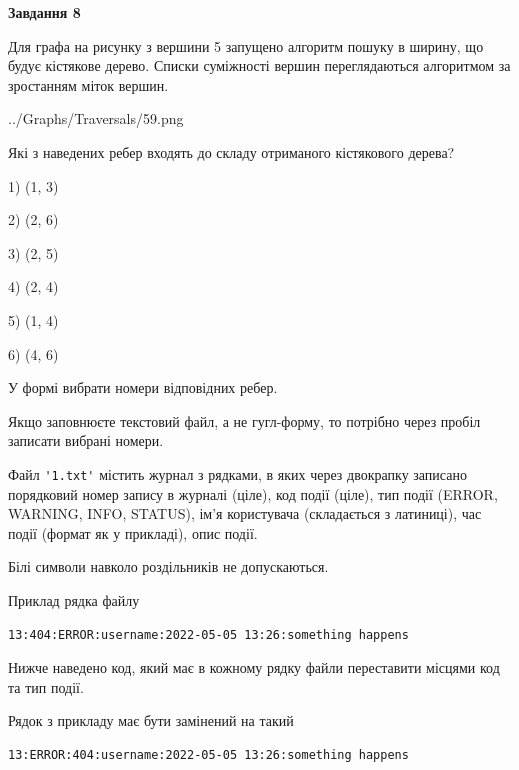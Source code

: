 \documentclass[12pt, ukrainian]{article}
\def\code#1{\Verb!#1!}
\begin{document}
{\begin {large}
{\begin {center}\textbf{Завдання 8}\end {center}}\par
Для графа на рисунку з вершини 5 запущено алгоритм пошуку в ширину, що будує кістякове дерево. Списки суміжності вершин переглядаються алгоритмом за зростанням міток вершин.\par
\begin{center}
	{../Graphs/Traversals/59.png}
\end{center}
\par Які з наведених ребер входять до складу отриманого кістякового дерева?\par
1) (1, 3)\par
2) (2, 6)\par
3) (2, 5)\par
4) (2, 4)\par
5) (1, 4)\par
6) (4, 6)\par
{\vskip 15pt} У формі вибрати номери відповідних ребер.


Якщо заповнюєте текстовий файл, а не гугл-форму, то потрібно через пробіл записа\-ти вибрані номери.\par
\newpage


Файл \code{'1.txt'} містить журнал з рядками, в яких через двокрапку записано поряд\-ко\-вий номер запису в журналі (ціле), код події (ціле), тип події (ERROR,\\ WARNING, INFO, STATUS), ім'я користувача (складається з латиниці), час події (фор\-мат як у прикладі), опис події.

Білі символи навколо роздільників не допускаються.

Приклад рядка файлу



\begin{verbatim}
13:404:ERROR:username:2022-05-05 13:26:something happens
\end{verbatim}


Нижче наведено код, який має в кожному рядку файли переставити місцями код та тип події.

Рядок з прикладу має бути замінений на такий



\begin{verbatim}
13:ERROR:404:username:2022-05-05 13:26:something happens
\end{verbatim}





\end{large}}
\end{document}
